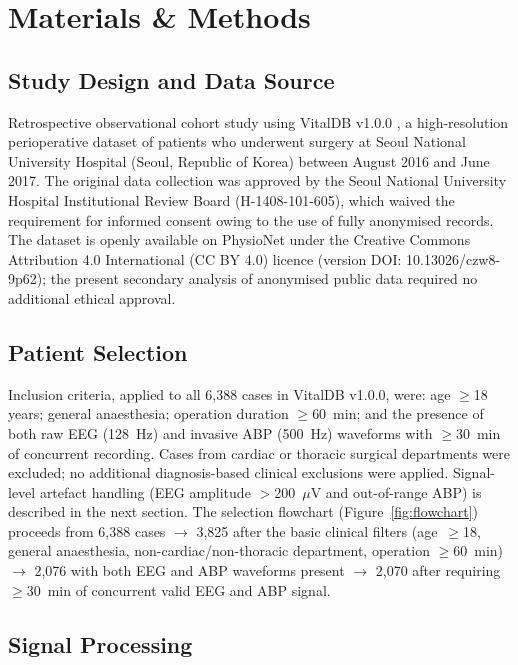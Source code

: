 \documentclass[fleqn,10pt,lineno]{wlpeerj}
\begin{document}
\section{Materials \& Methods}

\subsection{Study Design and Data Source}

Retrospective observational cohort study using VitalDB v1.0.0 \citep{lee2022}, a
high-resolution perioperative dataset of patients who underwent surgery at Seoul National
University Hospital (Seoul, Republic of Korea) between August 2016 and June 2017. The original
data collection was approved by the Seoul National University Hospital Institutional Review
Board (H-1408-101-605), which waived the requirement for informed consent owing to the use of
fully anonymised records. The dataset is openly available on PhysioNet under the Creative
Commons Attribution 4.0 International (CC BY 4.0) licence (version DOI:
10.13026/czw8-9p62); the present secondary analysis of anonymised public data required no
additional ethical approval.

\subsection{Patient Selection}

Inclusion criteria, applied to all 6,388 cases in VitalDB v1.0.0, were: age $\geq$18 years;
general anaesthesia; operation duration $\geq$60~min; and the presence of both raw EEG
(128~Hz) and invasive ABP (500~Hz) waveforms with $\geq$30~min of concurrent recording. Cases
from cardiac or thoracic surgical departments were excluded; no additional diagnosis-based
clinical exclusions were applied. Signal-level artefact handling (EEG amplitude $>$200~$\mu$V
and out-of-range ABP) is described in the next section. The selection flowchart
(Figure~\ref{fig:flowchart}) proceeds from 6,388 cases $\to$ 3,825 after the basic clinical
filters (age~$\geq$18, general anaesthesia, non-cardiac/non-thoracic department, operation
$\geq$60~min) $\to$ 2,076 with both EEG and ABP waveforms present $\to$ 2,070 after requiring
$\geq$30~min of concurrent valid EEG and ABP signal.

\subsection{Signal Processing}
\end{document}
